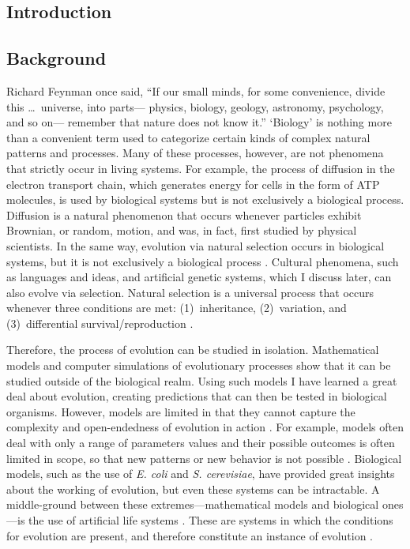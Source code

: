 \begin{doublespace}

\chapter*{Introduction}

\section*{Background}

Richard Feynman once said, ``If our small minds, for some convenience,
divide this \ldots\ universe, into parts---%
physics, biology, geology, astronomy, psychology, and so on---%
remember that nature does not know it.''
%
`Biology' is nothing more than a convenient term used to categorize
certain kinds of complex natural patterns and processes.
%
Many of these processes, however, are not phenomena
that strictly occur in living systems.
%
For example, the process of diffusion in the electron transport chain,
which generates energy for cells in the form of ATP molecules,
is used by biological systems but is not exclusively a biological process.
%
Diffusion is a natural phenomenon that occurs whenever
particles exhibit Brownian, or random, motion,
and was, in fact, first studied by physical scientists.
%
In the same way, evolution via natural selection occurs in biological systems,
but it is not exclusively a biological process \citep{pen07}.
%
Cultural phenomena, such as languages and ideas,
and artificial genetic systems, which I discuss later,
can also evolve via selection.
%
Natural selection is a universal process that occurs whenever
three conditions are met: (1)~inheritance, (2)~variation,
and (3)~differential survival/reproduction \citep{ada06}.



Therefore, the process of evolution can be studied in isolation.
%
Mathematical models and computer simulations of evolutionary processes
show that it can be studied outside of the biological realm.
%
Using such models I have learned a great deal about evolution,
creating predictions that can then be tested in biological organisms.
%
However, models are limited in that they cannot capture
the complexity and open-endedness of evolution in action \citep{yed01}.
%
For example, models often deal with only a range of parameters values
and their possible outcomes is often limited in scope,
so that new patterns or new behavior is not possible \citep{yed01}.
%
Biological models, such as the use of \emph{E. coli} and \emph{S. cerevisiae},
have provided great insights about the working of evolution,
but even these systems can be intractable.
%
A middle-ground between these extremes---mathematical models
and biological ones---is the use of artificial life systems \citep{yed01}.
%
These are systems in which the conditions for evolution are present,
and therefore constitute an instance of evolution \citep{pen07}.




\end{doublespace}
